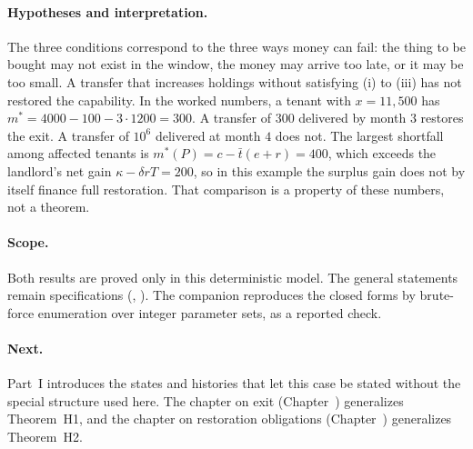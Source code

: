 \paragraph{Hypotheses and interpretation.} The three conditions correspond to the three ways money can fail: the thing to be bought may not exist in the window, the money may arrive too late, or it may be too small. A transfer that increases holdings without satisfying (i) to (iii) has not restored the capability. In the worked numbers, a tenant with $x=11{,}500$ has $m^\ast=4000-100-3\cdot1200=300$. A transfer of $300$ delivered by month $3$ restores the exit. A transfer of $10^6$ delivered at month $4$ does not. The largest shortfall among affected tenants is $m^\ast(P)=c-\bar t(e+r)=400$, which exceeds the landlord's net gain $\kappa-\delta rT=200$, so in this example the surplus gain does not by itself finance full restoration. That comparison is a property of these numbers, not a theorem.

\paragraph{Scope.} Both results are proved only in this deterministic model. The general statements remain specifications (, ). The companion reproduces the closed forms by brute-force enumeration over integer parameter sets, as a reported check.

\paragraph{Next.} Part~I introduces the states and histories that let this case be stated without the special structure used here. The chapter on exit (Chapter~) generalizes Theorem~H1, and the chapter on restoration obligations (Chapter~) generalizes Theorem~H2.
